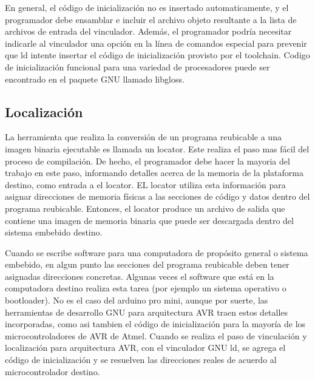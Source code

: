 \documentclass[12pt]{article}
\begin{document}
En general, el código de inicialización no es insertado automaticamente, y el
programador debe ensamblar e incluir el archivo objeto resultante a la 
lista de archivos de entrada del vinculador. Además, el programador
podría necesitar indicarle al vinculador una opción en la línea de comandos especial
para prevenir que ld intente insertar el código de inicialización provisto
por el toolchain.
Codigo de inicialización funcional para una variedad de procesadores puede
ser encontrado en el paquete GNU llamado libgloss.



\subsection *{Localización}

La herramienta que realiza la conversión de un programa reubicable a
una imagen binaria ejecutable es llamada un locator.
Este realiza el paso mas fácil del proceso de compilación. De hecho, 
el programador debe hacer la mayoria del trabajo en este paso, informando
detalles acerca de la memoria de la plataforma destino, como entrada
a el locator. EL locator utiliza esta información para asignar direcciones
de memoria físicas a las secciones de código y datos dentro del programa
reubicable. Entonces, el locator produce un archivo de salida que contiene
una imagen de memoria binaria que puede ser descargada dentro del sistema
embebido destino.

Cuando se escribe software para una computadora de propósito general o
sistema embebido, en algun punto las secciones del programa reubicable
deben tener asignadas direcciones concretas. Algunas veces el software
que está en la computadora destino realiza esta tarea (por ejemplo un sistema
operativo o bootloader). No es el caso del arduino pro mini, aunque por suerte,
las herramientas de desarrollo GNU para arquitectura AVR traen estos detalles 
incorporadas, como asi tambien el código de inicialización para la mayoría
de los microcontroladores de AVR de Atmel.
Cuando se realiza el paso de vinculación y localización para arquitectura AVR,
con el vinculador GNU ld, se agrega el código de inicialización y se 
resuelven las direcciones reales de acuerdo al microcontrolador destino.
\end{document}

